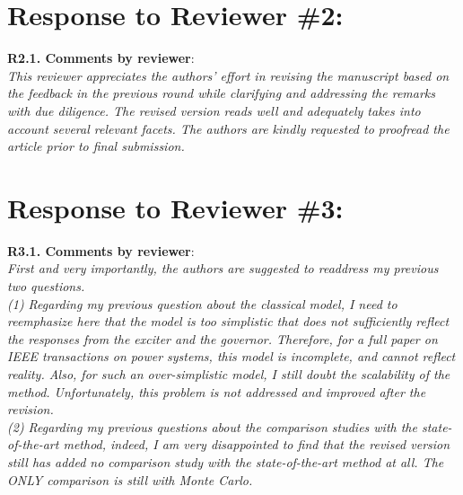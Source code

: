 \documentclass[12pt,onecolumn]{IEEEtran}
\newcommand{\blue}{\color{blue}}
\newcommand{\nib}{\noindent  {\bf Response:} }
\begin{document}

\section*{\large \bf Response to Reviewer \#2:}

\noindent
{\bf R2.1. Comments by reviewer}:\\
{\em This reviewer appreciates the authors' effort in revising the manuscript based on the feedback in the previous round while clarifying and addressing the remarks with due diligence. The revised version reads well and adequately takes into account several relevant facets. The authors are kindly requested to proofread the article prior to final submission.}

{\nib \blue{Thank you, we have thoroughly proofread the article. We appreciate your comments from previous rounds to help us improve the manuscript.}}


\newpage
\section*{\large \bf Response to Reviewer \#3:}

\noindent
{\bf R3.1. Comments by reviewer}:\\
{\em First and very importantly, the authors are suggested to readdress my previous two questions.\\
\noindent(1) Regarding my previous question about the classical model, I need to reemphasize here that the model is too simplistic that does not sufficiently reflect the responses from the exciter and the governor. Therefore, for a full paper on IEEE transactions on power systems, this model is incomplete, and cannot reflect reality. Also, for such an over-simplistic model, I still doubt the scalability of the method. Unfortunately, this problem is not addressed and improved after the revision.\\
\noindent(2) Regarding my previous questions about the comparison studies with the state-of-the-art method, indeed, I am very disappointed to find that the revised version still has added no comparison study with the state-of-the-art method at all. The ONLY comparison is still with Monte Carlo.}

{\nib \blue{The 
}}
\end{document}

